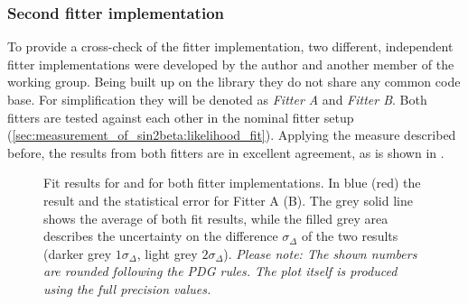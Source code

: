 \subsubsection{Second fitter implementation}
\label{sec:measurement_of_sin2beta:systematics:cross_checks:second_fitter}
%
To provide a cross-check of the fitter implementation, two different,
independent fitter implementations were developed by the author and another
member of the working group. Being built up on the \RooFit library they do not
share any common code base. For simplification they will be denoted as
\emph{Fitter A} and \emph{Fitter B}. Both fitters are tested against each other
in the nominal fitter setup (\cref{sec:measurement_of_sin2beta:likelihood_fit}).
Applying the measure described before, the results from both fitters are in
excellent agreement, as is shown in
.
%
\begin{figure}
\centering


\caption{
Fit results for \SJpsiKS and \CJpsiKS for both fitter implementations.
In blue (red) the result and the statistical error for Fitter A (B). The
grey solid line shows the average of both fit results, while the filled grey
area describes the uncertainty on the difference $\sigma_\Delta$ of the two
results (darker grey $1\sigma_\Delta$, light grey $2\sigma_\Delta$).
\textit{Please note: The shown numbers are rounded following the PDG rules. The
plot itself is produced using the full precision values.} }
\label{fig:measurement_of_sin2beta:systematics:cross_checks:second_fitter}
\end{figure}


